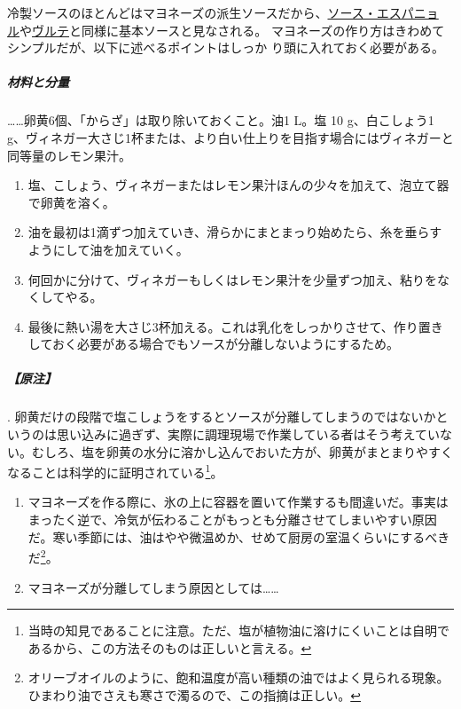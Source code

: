 \begin{recette}

冷製ソースのほとんどはマヨネーズの派生ソースだから、\protect\hyperlink{sauce-espagnole}{ソース・エスパニョ
ル}や\protect\hyperlink{veloute}{ヴルテ}と同様に基本ソースと見なされる。
マヨネーズの作り方はきわめてシンプルだが、以下に述べるポイントはしっか
り頭に入れておく必要がある。

\hypertarget{ux6750ux6599ux3068ux5206ux91cf}{%
\subparagraph{材料と分量}\label{ux6750ux6599ux3068ux5206ux91cf}}

\ldots{}\ldots{}卵黄6個、「からざ」は取り除いておくこと。油1 L。塩 10
g、白こしょう1
g、ヴィネガー大さじ1\undemi{}杯または、より白い仕上りを目指す場合にはヴィネガーと同等量のレモン果汁。

\begin{enumerate}
\def\labelenumi{\arabic{enumi}.}
\item
  塩、こしょう、ヴィネガーまたはレモン果汁ほんの少々を加えて、泡立て器で卵黄を溶く。
\item
  油を最初は1滴ずつ加えていき、滑らかにまとまっり始めたら、糸を垂らすようにして油を加えていく。
\item
  何回かに分けて、ヴィネガーもしくはレモン果汁を少量ずつ加え、粘りをなくしてやる。
\item
  最後に熱い湯を大さじ3杯加える。これは乳化をしっかりさせて、作り置きしておく必要がある場合でもソースが分離しないようにするため。
\end{enumerate}

\hypertarget{ux539fux6ce8-2}{%
\subparagraph{【原注】}\label{ux539fux6ce8-2}}

.
卵黄だけの段階で塩こしょうをするとソースが分離してしまうのではないかというのは思い込みに過ぎず、実際に調理現場で作業している者はそう考えていない。むしろ、塩を卵黄の水分に溶かし込んでおいた方が、卵黄がまとまりやすくなることは科学的に証明されている\footnote{当時の知見であることに注意。ただ、塩が植物油に溶けにくいことは自明であるから、この方法そのものは正しいと言える。}。

\begin{enumerate}
\def\labelenumi{\arabic{enumi}.}
\setcounter{enumi}{1}
\item
  マヨネーズを作る際に、氷の上に容器を置いて作業するも間違いだ。事実はまったく逆で、冷気が伝わることがもっとも分離させてしまいやすい原因だ。寒い季節には、油はやや微温めか、せめて厨房の室温くらいにするべきだ\footnote{オリーブオイルのように、飽和温度が高い種類の油ではよく見られる現象。ひまわり油でさえも寒さで濁るので、この指摘は正しい。}。
\item
  マヨネーズが分離してしまう原因としては\ldots{}\ldots{}


\end{enumerate}
\end{recette}
